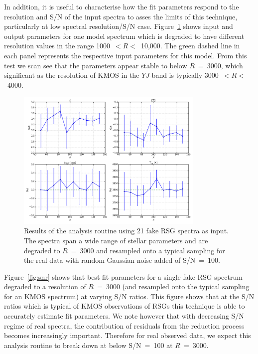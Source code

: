 In addition, it is useful to characterise how the fit parameters respond to the resolution and S/N of the input spectra to asses the limits of this technique, particularly at low spectral resolution/S/N case.
Figure~\ref{fig:tres} shows input and output parameters for one model spectrum which is degraded to have different resolution values in the range 1000~$< R <$~10,000.
The green dashed line in each panel represents the respective input parameters for this model.
From this test we scan see that the parameters appear stable to below $R$~=~3000, which significant as the resolution of KMOS in the $YJ$-band is typically 3000~$< R <$~4000.



\begin{figure}
 \centering
 \includegraphics[width=0.80\textwidth]{JAnal/Fakespec-tres-v1}
 \caption[Analysis test resolution]{
Results of the analysis routine using 21 fake RSG spectra as input.
The spectra span a wide range of stellar parameters and are degraded to $R~=~3000$ and resampled onto a typical sampling for the real data with random Gaussian noise added of S/N~=~100.
\label{fig:tres}
         }
\end{figure}

Figure~\ref{fig:snr} shows that best fit parameters for a single fake RSG spectrum degraded to a resolution of $R$~=~3000 (and resampled onto the typical sampling for an KMOS spectrum) at varying S/N ratios.
This figure shows that at the S/N ratios which is typical of KMOS observations of RSGs this technique is able to accurately estimate fit parameters.
We note however that with decreasing S/N regime of real spectra, the contribution of residuals from the reduction process becomes increasingly important.
Therefore for real observed data, we expect this analysis routine to break down at below S/N~=~100 at $R$~=~3000.

